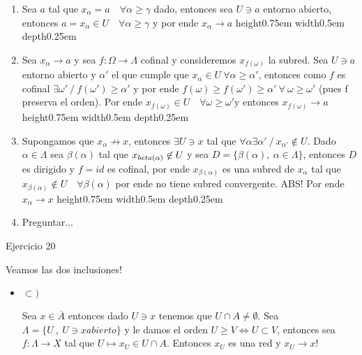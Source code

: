 \documentclass[11pt]{article}
\newcommand{\sett}[1]{\{#1\}}
\newenvironment{proof}[1][Demostraci\'on]{\begin{trivlist}
\item[\hskip \labelsep {\bfseries #1}]}{\end{trivlist}}
\newcommand{\qed}{\nobreak \ifvmode \relax \else
      \ifdim\lastskip<1.5em \hskip-\lastskip
      \hskip1.5em plus0em minus0.5em \fi \nobreak
      \vrule height0.75em width0.5em depth0.25em\fi}
\begin{document}
\begin{enumerate}
\begin{proof}
\begin{enumerate}
\item Sea $a$ tal que $x_{\alpha} = a \quad \forall \alpha \geq \gamma$ dado, entonces sea $U \ni a$ entorno abierto, entonces $a=x_{\alpha} \in U \quad \forall \alpha \geq \gamma$ y por ende $x_{\alpha} \rightarrow a$ \qed
\item Sea $x_{\alpha} \rightarrow a$ y sea $f : \Omega \rightarrow \Lambda$ cofinal y consideremos $x_{f(\omega)}$ la subred. Sea $U \ni a$ entorno abierto y $\alpha '$ el que cumple que $x_{\alpha} \in U \ \forall \alpha \geq \alpha'$, entonces como $f$ es cofinal $\exists \omega' \ / \ f(\omega') \geq \alpha'$  y por ende $f(\omega) \geq f(\omega') \geq \alpha' \ \forall \ \omega \geq \omega'$ (pues f preserva el orden). Por ende $x_{f(\omega)} \in U \quad \forall \omega \geq \omega'$y entonces $x_{f(\omega)} \rightarrow a$ \qed

\item Supongamos que $x_{\alpha} \not \rightarrow x$, entonces $\exists U \ni x$ tal que $\forall \alpha \exists \alpha' \ / \ x_{\alpha'} \not \in U$. Dado $\alpha \in \Lambda$ sea $\beta(\alpha)$ tal que $x_{\\beta(\alpha)} \not \in U$ y sea $D = \sett{\beta(\alpha), \ \alpha \in \Lambda}$, entonces $D$ es dirigido y $f=id$ es cofinal, por ende $x_{\beta(\alpha)}$ es una subred de $x_{\alpha}$ tal que $x_{\beta(\alpha)} \not \in U \quad \forall \beta(\alpha)$ por ende no tiene subred convergente. ABS! Por ende $x_{\alpha} \rightarrow x$\qed

\item Preguntar...

\end{enumerate}
\end{proof}

\item {Ejercicio 20}

\begin{proof}
Veamos las dos inclusiones!

\begin{itemize}
\item {$\subset)$}

Sea $x \in \overline{A}$ entonces dado $U \ni x$ tenemos que $U \cap A \neq \emptyset$. Sea $\Lambda = \sett{U \ , \ U \ni x \textit{abierto}}$ y le damos el orden $U \geq V \Longleftrightarrow U \subset V$, entonces sea $f: \Lambda \rightarrow X $ tal que $U \mapsto x_U \in U \cap A$. Entonces $x_U$ es una red y $x_U \rightarrow x$!


\end{itemize}
\end{proof}
\end{enumerate}
\end{document}

